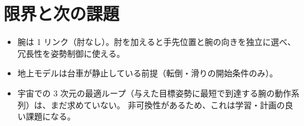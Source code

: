 \section{限界と次の課題}

\begin{itemize}
\tightlist
\item
  腕は 1 リンク（肘なし）。肘を加えると手先位置と腕の向きを独立に選べ、冗長性を姿勢制御に使える。
\item
  地上モデルは台車が静止している前提（転倒・滑りの開始条件のみ）。
\item
  宇宙での 3 次元の最適ループ（与えた目標姿勢に最短で到達する腕の動作系列）は、まだ求めていない。 非可換性があるため、これは学習・計画の良い課題になる。
\end{itemize}
